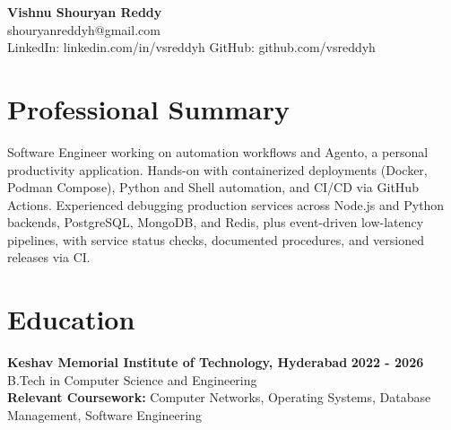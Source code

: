 \documentclass[a4paper,11pt]{article}
\newcommand{\resumeSubheading}[4]{%
  \textbf{#1} \hfill \textbf{#2} \\
{#3} \hfill {#4}
}
\begin{document}
\pagestyle{empty}
\raggedbottom
\addtolength{\textheight}{2\baselineskip}
\small

\begin{center}
  {\LARGE \textbf{Vishnu Shouryan Reddy}}\\[0.3em]
  shouryanreddyh@gmail.com \\[0.3em]
  LinkedIn: linkedin.com/in/vsreddyh \textbar{} GitHub: github.com/vsreddyh
\end{center}
\vspace{-0.8em}

\section*{Professional Summary}

Software Engineer working on automation workflows and Agento, a personal productivity application. Hands-on with containerized deployments (Docker, Podman Compose), Python and Shell automation, and CI/CD via GitHub Actions. Experienced debugging production services across Node.js and Python backends, PostgreSQL, MongoDB, and Redis, plus event-driven low-latency pipelines, with service status checks, documented procedures, and versioned releases via CI.

\section*{Education}

\resumeSubheading
{Keshav Memorial Institute of Technology, Hyderabad}{2022 - 2026}
{B.Tech in Computer Science and Engineering}{} \\
\textbf{Relevant Coursework:} Computer Networks, Operating Systems, Database Management, Software Engineering


\end{document}
